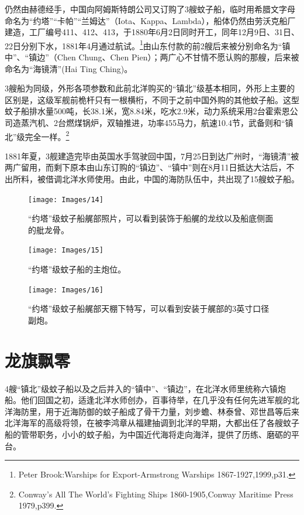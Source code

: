 \documentclass[12pt,UTF8]{ctexbook}
\begin{document}
仍然由赫德经手，中国向阿姆斯特朗公司又订购了3艘蚊子船，临时用希腊文字母命名为“约塔”“卡帕”“兰姆达”（Iota、Kappa、Lambda），船体仍然由劳沃克船厂建造，工厂编号411、412、413，于1880年6月2日同时开工，同年12月9日、31日、22日分别下水，1881年4月通过航试。\footnote{Peter Brook:Warships for Export-Armstrong Warships 1867-1927,1999,p31.}由山东付款的前2艘后来被分别命名为“镇中”、“镇边”（Chen Chung、Chen Pien）；两广心不甘情不愿认购的那艘，后来被命名为“海镜清”(Hai Ting Ching)。

3艘船为同级，外形各项参数和此前北洋购买的“镇北”级基本相同，外形上主要的区别是，这级军舰前桅杆只有一根横桁，不同于之前中国外购的其他蚊子船。这型蚊子船排水量500吨，长38.1米，宽8.84米，吃水2.9米，动力系统采用2台霍索恩公司造蒸汽机、2台燃煤锅炉，双轴推进，功率455马力，航速10.4节，武备则和“镇北”级完全一样。\footnote{Conway's All The World's Fighting Ships 1860-1905,Conway Maritime Press 1979,p399.}

1881年夏，3舰建造完毕由英国水手驾驶回中国，7月25日到达广州时，“海镜清”被两广留用，而剩下原本由山东订购的“镇边”、“镇中”则在8月11日抵达大沽后，不出所料，被借调北洋水师使用。由此，中国的海防队伍中，共出现了15艘蚊子船。

\begin{figure}[htbp]
	\centering
	\texttt{[image: Images/14]}
	\caption{“约塔”级蚊子船艉部照片，可以看到装饰于船艉的龙纹以及船底侧面的舭龙骨。}
	\label{fig:1}
\end{figure}

\begin{figure}[htbp]
	\centering
	\texttt{[image: Images/15]}
	\caption{“约塔”级蚊子船的主炮位。}
	\label{fig:1}
\end{figure}

\begin{figure}[htbp]
	\centering
	\texttt{[image: Images/16]}
	\caption{“约塔”级蚊子船艉部天棚下特写，可以看到安装于艉部的3英寸口径副炮。}
	\label{fig:1}
\end{figure}

\section{龙旗飘零}

4艘“镇北”级蚊子船以及之后并入的“镇中”、“镇边”，在北洋水师里统称六镇炮船。他们回国之初，适逢北洋水师创办，百事待举，在几乎没有任何先进军舰的北洋海防里，用于近海防御的蚊子船成了骨干力量，刘步蟾、林泰曾、邓世昌等后来北洋海军的高级将领，在被李鸿章从福建抽调到北洋的早期，大都出任了各艘蚊子船的管带职务，小小的蚊子船，为中国近代海将走向海洋，提供了历练、磨砺的平台。
\end{document}
